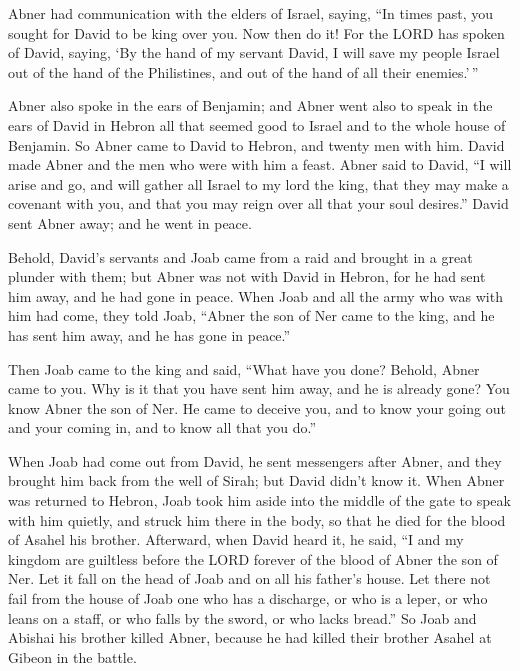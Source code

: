  Abner had communication with the elders of Israel,
saying, ``In times past, you sought for David to be king over you.
 Now then do it! For the LORD has spoken of David,
saying, `By the hand of my servant David, I will save my people Israel
out of the hand of the Philistines, and out of the hand of all their
enemies.'\,''

 Abner also spoke in the ears of Benjamin; and Abner went
also to speak in the ears of David in Hebron all that seemed good to
Israel and to the whole house of Benjamin.  So Abner came
to David to Hebron, and twenty men with him. David made Abner and the
men who were with him a feast.  Abner said to David, ``I
will arise and go, and will gather all Israel to my lord the king, that
they may make a covenant with you, and that you may reign over all that
your soul desires.'' David sent Abner away; and he went in peace.

 Behold, David's servants and Joab came from a raid and
brought in a great plunder with them; but Abner was not with David in
Hebron, for he had sent him away, and he had gone in peace.
 When Joab and all the army who was with him had come,
they told Joab, ``Abner the son of Ner came to the king, and he has sent
him away, and he has gone in peace.''

 Then Joab came to the king and said, ``What have you
done? Behold, Abner came to you. Why is it that you have sent him away,
and he is already gone?  You know Abner the son of Ner.
He came to deceive you, and to know your going out and your coming in,
and to know all that you do.''

 When Joab had come out from David, he sent messengers
after Abner, and they brought him back from the well of Sirah; but David
didn't know it.  When Abner was returned to Hebron, Joab
took him aside into the middle of the gate to speak with him quietly,
and struck him there in the body, so that he died for the blood of
Asahel his brother.  Afterward, when David heard it, he
said, ``I and my kingdom are guiltless before the LORD forever of the
blood of Abner the son of Ner.  Let it fall on the head
of Joab and on all his father's house. Let there not fail from the house
of Joab one who has a discharge, or who is a leper, or who leans on a
staff, or who falls by the sword, or who lacks bread.'' 
So Joab and Abishai his brother killed Abner, because he had killed
their brother Asahel at Gibeon in the battle.

